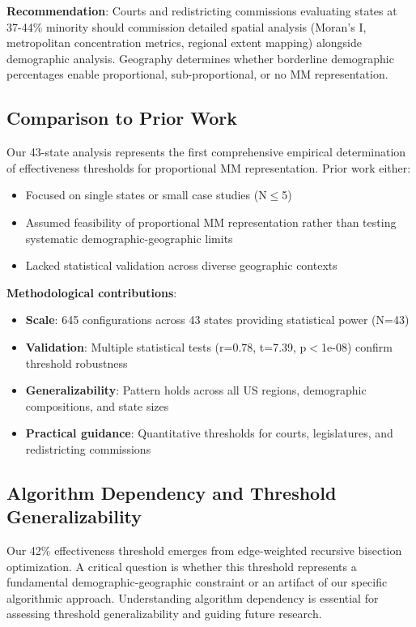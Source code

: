 \textbf{Recommendation}: Courts and redistricting commissions evaluating states at 37-44\% minority should commission detailed spatial analysis (Moran's I, metropolitan concentration metrics, regional extent mapping) alongside demographic analysis. Geography determines whether borderline demographic percentages enable proportional, sub-proportional, or no MM representation.

\subsection{Comparison to Prior Work}

Our 43-state analysis represents the first comprehensive empirical determination of effectiveness thresholds for proportional MM representation. Prior work either:
\begin{itemize}
    \item Focused on single states or small case studies (N$\leq$5)
    \item Assumed feasibility of proportional MM representation rather than testing systematic demographic-geographic limits
    \item Lacked statistical validation across diverse geographic contexts
\end{itemize}

\textbf{Methodological contributions}:
\begin{itemize}
    \item \textbf{Scale}: 645 configurations across 43 states providing statistical power (N=43)
    \item \textbf{Validation}: Multiple statistical tests (r=0.78, t=7.39, p$<$1e-08) confirm threshold robustness
    \item \textbf{Generalizability}: Pattern holds across all US regions, demographic compositions, and state sizes
    \item \textbf{Practical guidance}: Quantitative thresholds for courts, legislatures, and redistricting commissions
\end{itemize}

\subsection{Algorithm Dependency and Threshold Generalizability}

Our 42\% effectiveness threshold emerges from edge-weighted recursive bisection optimization. A critical question is whether this threshold represents a fundamental demographic-geographic constraint or an artifact of our specific algorithmic approach. Understanding algorithm dependency is essential for assessing threshold generalizability and guiding future research.

